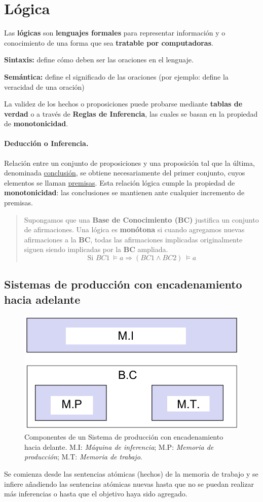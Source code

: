 \documentclass[10pt,a4paper]{article}
\begin{document}
\section{Lógica}
Las \textbf{lógicas} son \textbf{lenguajes formales} para representar información y o conocimiento de una forma que sea \textbf{tratable por computadoras}.
\begin{description}
\item \textbf{Sintaxis:} define cómo deben ser las oraciones en el lenguaje.
\item \textbf{Semántica:} define el significado de las oraciones (por ejemplo: define la veracidad de una oración)
\end{description}
La validez de los hechos o proposiciones puede probarse mediante \textbf{tablas de verdad} o a través de \textbf{Reglas de Inferencia}, las cuales se basan en la propiedad de \textbf{monotonicidad}.

\paragraph{Deducción o Inferencia.}
Relación entre un conjunto de proposiciones y una proposición tal que la última, denominada \underline{conclusión}, se obtiene necesariamente del primer conjunto, cuyos elementos se llaman \underline{premisas}.  Esta relación lógica cumple la propiedad de \textbf{monotonicidad}: las conclusiones se mantienen ante cualquier incremento de premisas.

\begin{quote}
Supongamos que una \textbf{Base de Conocimiento (BC)} justifica un conjunto de afirmaciones. Una lógica es \textbf{monótona} si cuando agregamos nuevas afirmaciones a la \textbf{BC}, todas las afirmaciones implicadas originalmente siguen siendo implicadas por la \textbf{BC} ampliada.
\[\text{Si }BC1 \: \models a \Rightarrow (BC1 \wedge BC2)\: \models a\]
\end{quote}

\subsection{Sistemas de producción con encadenamiento hacia adelante}
\begin{figure}
  \label{fig:encadenamiento}
  \caption{Componentes de un Sistema de producción con encadenamiento hacia delante. M.I: \textit{Máquina de inferencia}; M.P: \textit{Memoria de producción}; M.T: \textit{Memoria de trabajo}.}
  \centering
  \hbox{\includegraphics[width=0.4\textwidth-\fboxrule-\fboxrule]{encadenamiento.png}}  
\end{figure}
Se comienza desde las sentencias atómicas (hechos) de la memoria de trabajo y se infiere añadiendo las sentencias atómicas nuevas hasta que no se puedan realizar más inferencias o hasta que el objetivo haya sido agregado.
\end{document}
